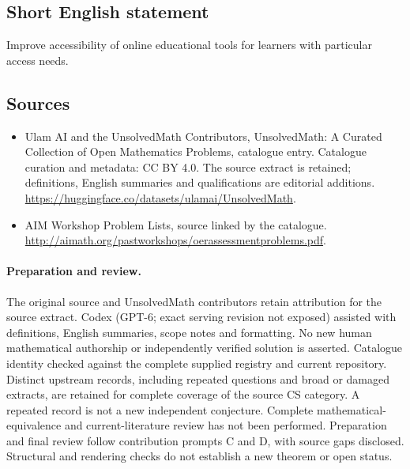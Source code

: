 \documentclass[11pt]{article}
\begin{document}
\subsection{Short English statement}
Improve accessibility of online educational tools for learners with particular access needs.
\subsection{Sources}
\begin{itemize}
\item[\hypertarget{source:statement:1}{S1}] Ulam AI and the UnsolvedMath Contributors, UnsolvedMath: A Curated Collection of Open Mathematics Problems, catalogue entry. Catalogue curation and metadata: CC BY 4.0. The source extract is retained; definitions, English summaries and qualifications are editorial additions.
\url{https://huggingface.co/datasets/ulamai/UnsolvedMath}.
\item[\hypertarget{source:statement:2}{S2}] AIM Workshop Problem Lists, source linked by the catalogue.
\url{http://aimath.org/pastworkshops/oerassessmentproblems.pdf}.
\end{itemize}
\paragraph{Preparation and review.}
The original source and UnsolvedMath contributors retain attribution for the source extract. Codex (GPT-6; exact serving revision not exposed) assisted with definitions, English summaries, scope notes and formatting. No new human mathematical authorship or independently verified solution is asserted. Catalogue identity checked against the complete supplied registry and current repository. Distinct upstream records, including repeated questions and broad or damaged extracts, are retained for complete coverage of the source CS category. A repeated record is not a new independent conjecture. Complete mathematical-equivalence and current-literature review has not been performed. Preparation and final review follow contribution prompts C and D, with source gaps disclosed. Structural and rendering checks do not establish a new theorem or open status.
\label{end:statement}
\end{document}
